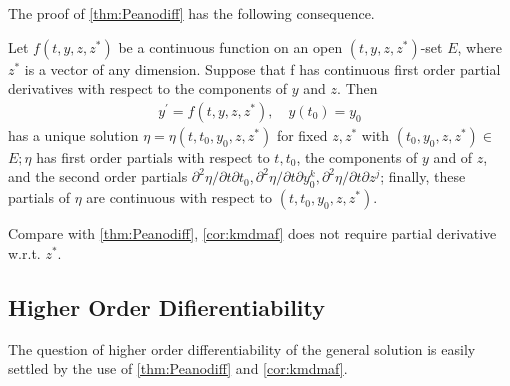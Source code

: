 \documentclass{article}
\begin{document}
The proof of \cref{thm:Peanodiff} has the following consequence.
\begin{cora}\label{cor:kmdmaf}
 Let $f\left(t, y, z, z^{*}\right)$ be a continuous function on an open $\left(t, y, z, z^{*}\right)$-set $E$, where $z^{*}$ is a vector of any dimension. Suppose that f has continuous first order partial derivatives with respect to the components of $y$ and $z$. Then
\begin{align*}
y^{\prime}=f\left(t, y, z, z^{*}\right), \quad y\left(t_{0}\right)=y_{0}
\end{align*}
has a unique solution $\eta=\eta\left(t, t_{0}, y_{0}, z, z^{*}\right)$ for fixed $z, z^{*}$ with $\left(t_{0}, y_{0}, z, z^{*}\right) \in$ $E ; \eta$ has first order partials with respect to $t, t_{0}$, the components of $y$ and of $z$, and the second order partials $\partial^{2} \eta / \partial t \partial t_{0}, \partial^{2} \eta / \partial t \partial y_{0}^{k}, \partial^{2} \eta / \partial t \partial z^{j}$; finally, these partials of $\eta$ are continuous with respect to $\left(t, t_{0}, y_{0}, z, z^{*}\right)$.
\end{cora} 
\begin{rema}
Compare with \cref{thm:Peanodiff}, \cref{cor:kmdmaf} does not require partial derivative w.r.t. $z^*$. 
\end{rema}

\subsection{Higher Order Difierentiability}
The question of higher order differentiability of the general solution is easily settled by the use of \cref{thm:Peanodiff} and \cref{cor:kmdmaf}.
\end{document}
